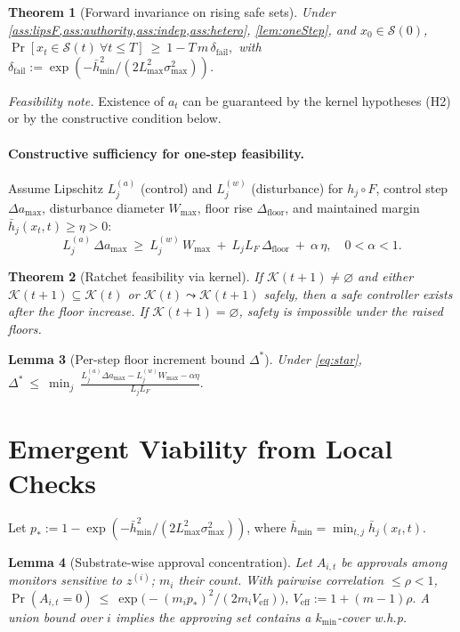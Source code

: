 \documentclass[11pt]{article}
\newtheorem{theorem}{Theorem}[section]
\newtheorem{lemma}[theorem]{Lemma}
\theoremstyle{definition}
\newcommand{\K}{\mathcal{K}}
\newcommand{\Sset}{\mathcal{S}}
\begin{document}
\begin{theorem}[Forward invariance on rising safe sets]\label{thm:fwd}
Under \cref{ass:lipsF,ass:authority,ass:indep,ass:hetero}, \cref{lem:oneStep}, and $x_0\in \Sset(0)$,
\(
\Pr[x_t\in \Sset(t)\ \forall t\le T]\ \ge\ 1 - T\,m\,\delta_{\mathrm{fail}},
\)
with $\delta_{\mathrm{fail}}:=\exp(-\bar h_{\min}^2/(2L_{\max}^2\sigma_{\max}^2))$.
\end{theorem}
\noindent\emph{Feasibility note.} Existence of $a_t$ can be guaranteed by the kernel hypotheses (H2) or by the constructive condition below.

\paragraph{Constructive sufficiency for one-step feasibility.}
Assume Lipschitz $L^{(a)}_j$ (control) and $L^{(w)}_j$ (disturbance) for $h_j\!\circ\! F$, control step $\Delta a_{\max}$, disturbance diameter $W_{\max}$, floor rise $\Delta_{\mathrm{floor}}$, and maintained margin $\bar h_j(x_t,t)\ge \eta>0$:
\begin{equation}
\label{eq:star}
L^{(a)}_j\,\Delta a_{\max}\ \ge\ L^{(w)}_j\,W_{\max}\ +\ L_j L_F\,\Delta_{\mathrm{floor}}\ +\ \alpha\,\eta,\quad 0<\alpha<1.
\end{equation}

\begin{theorem}[Ratchet feasibility via kernel]\label{thm:kernelRatchet}
If $\K(t+1)\neq\varnothing$ and either $\K(t+1)\subseteq\K(t)$ or $\K(t)\leadsto \K(t+1)$ safely, then a safe controller exists after the floor increase. If $\K(t+1)=\varnothing$, safety is impossible under the raised floors.
\end{theorem}

\begin{lemma}[Per-step floor increment bound $\Delta^\ast$]\label{lem:delta}
Under \cref{eq:star},
\(
\Delta^\ast\ \le\ \min_{j}\ \frac{L^{(a)}_j\Delta a_{\max} - L^{(w)}_jW_{\max} - \alpha\eta}{L_j L_F}.
\)
\end{lemma}

\section{Emergent Viability from Local Checks}
Let $p_\ast:=1-\exp(-\bar h_{\min}^2/(2L_{\max}^2\sigma_{\max}^2))$, where $\bar h_{\min}=\min_{t,j}\bar h_j(x_t,t)$.

\begin{lemma}[Substrate-wise approval concentration]\label{lem:substrate}
Let $A_{i,t}$ be approvals among monitors sensitive to $z^{(i)}$; $m_i$ their count. With pairwise correlation $\le \rho<1$,
\(
\Pr(A_{i,t}=0)\ \le\ \exp\!\big(-(m_i p_\ast)^2/(2 m_i V_{\mathrm{eff}})\big),\ 
V_{\mathrm{eff}}:=1+(m-1)\rho.
\)
A union bound over $i$ implies the approving set contains a $k_{\min}$-cover w.h.p.
\end{lemma}
\end{document}
